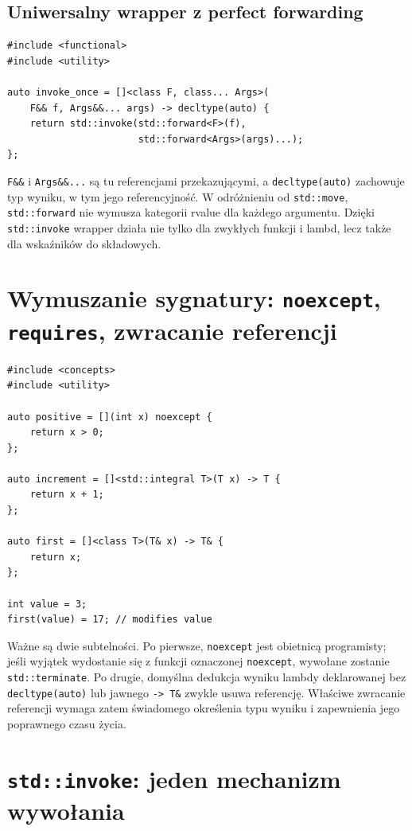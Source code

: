 \subsection{Uniwersalny wrapper z perfect forwarding}

\begin{lstlisting}
#include <functional>
#include <utility>

auto invoke_once = []<class F, class... Args>(
    F&& f, Args&&... args) -> decltype(auto) {
    return std::invoke(std::forward<F>(f),
                       std::forward<Args>(args)...);
};
\end{lstlisting}

\texttt{F\&\&} i \texttt{Args\&\&...} są tu referencjami przekazującymi,
a \texttt{decltype(auto)} zachowuje typ wyniku, w tym jego
referencyjność. W odróżnieniu od \texttt{std::move},
\texttt{std::forward} nie wymusza kategorii rvalue dla każdego argumentu.
Dzięki \texttt{std::invoke} wrapper działa nie tylko dla zwykłych
funkcji i lambd, lecz także dla wskaźników do składowych.

\section{Wymuszanie sygnatury: \texttt{noexcept}, \texttt{requires}, zwracanie referencji}

\begin{lstlisting}
#include <concepts>
#include <utility>

auto positive = [](int x) noexcept {
    return x > 0;
};

auto increment = []<std::integral T>(T x) -> T {
    return x + 1;
};

auto first = []<class T>(T& x) -> T& {
    return x;
};

int value = 3;
first(value) = 17; // modifies value
\end{lstlisting}

Ważne są dwie subtelności. Po pierwsze, \texttt{noexcept} jest obietnicą
programisty; jeśli wyjątek wydostanie się z funkcji oznaczonej
\texttt{noexcept}, wywołane zostanie \texttt{std::terminate}.
Po drugie, domyślna dedukcja wyniku lambdy deklarowanej bez
\texttt{decltype(auto)} lub jawnego \texttt{-> T\&} zwykle usuwa
referencję. Właściwe zwracanie referencji wymaga zatem świadomego
określenia typu wyniku i zapewnienia jego poprawnego czasu życia.

\section{\texttt{std::invoke}: jeden mechanizm wywołania}

